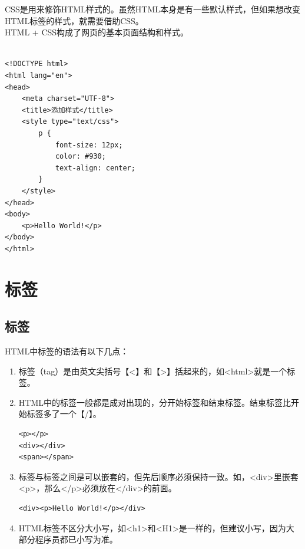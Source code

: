 CSS是用来修饰HTML样式的。虽然HTML本身是有一些默认样式，但如果想改变HTML标签的样式，就需要借助CSS。 \\

HTML + CSS构成了网页的基本页面结构和样式。 \\

 \\
\begin{lstlisting}[style=htmlcssjs]
<!DOCTYPE html>
<html lang="en">
<head>
    <meta charset="UTF-8">
    <title>添加样式</title>
    <style type="text/css">
        p {
            font-size: 12px;
            color: #930;
            text-align: center;
        }
    </style>
</head>
<body>
    <p>Hello World!</p>
</body>
</html>
\end{lstlisting}

\newpage

\section{标签}

\subsection{标签}

HTML中标签的语法有以下几点：

\begin{enumerate}
	\item 标签（tag）是由英文尖括号【<】和【>】括起来的，如<html>就是一个标签。

	\item HTML中的标签一般都是成对出现的，分开始标签和结束标签。结束标签比开始标签多了一个【/】。 \\
	      \begin{lstlisting}[style=htmlcssjs]
<p></p>
<div></div>
<span></span>
    \end{lstlisting}

	\item 标签与标签之间是可以嵌套的，但先后顺序必须保持一致。如，<div>里嵌套<p>，那么</p>必须放在</div>的前面。 \\
	      \begin{lstlisting}[style=htmlcssjs]
<div><p>Hello World!</p></div>
    \end{lstlisting}

	\item HTML标签不区分大小写，如<h1>和<H1>是一样的，但建议小写，因为大部分程序员都已小写为准。
\end{enumerate}

